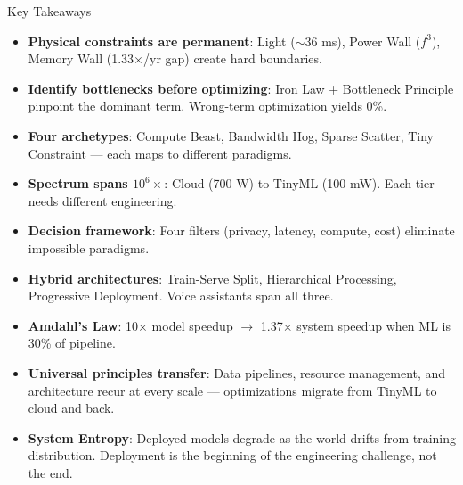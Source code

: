 \documentclass[aspectratio=169, 12pt]{beamer}
\begin{document}
\begin{frame}{Key Takeaways}
\note{
%
%
}

\scriptsize
\begin{itemize}\setlength\itemsep{0pt}
  \item \textbf{Physical constraints are permanent}: Light ($\sim$36 ms), Power Wall ($f^3$), Memory Wall (1.33$\times$/yr gap) create hard boundaries.
  \item \textbf{Identify bottlenecks before optimizing}: Iron Law + Bottleneck Principle pinpoint the dominant term. Wrong-term optimization yields 0\%.
  \item \textbf{Four archetypes}: Compute Beast, Bandwidth Hog, Sparse Scatter, Tiny Constraint --- each maps to different paradigms.
  \item \textbf{Spectrum spans $10^{6}\!\times$}: Cloud (700 W) to TinyML (100 mW). Each tier needs different engineering.
  \item \textbf{Decision framework}: Four filters (privacy, latency, compute, cost) eliminate impossible paradigms.
  \item \textbf{Hybrid architectures}: Train-Serve Split, Hierarchical Processing, Progressive Deployment. Voice assistants span all three.
  \item \textbf{Amdahl's Law}: 10$\times$ model speedup $\to$ 1.37$\times$ system speedup when ML is 30\% of pipeline.
  \item \textbf{Universal principles transfer}: Data pipelines, resource management, and architecture recur at every scale --- optimizations migrate from TinyML to cloud and back.
  \item \textbf{System Entropy}: Deployed models degrade as the world drifts from training distribution. Deployment is the beginning of the engineering challenge, not the end.
\end{itemize}

\end{frame}
\end{document}
